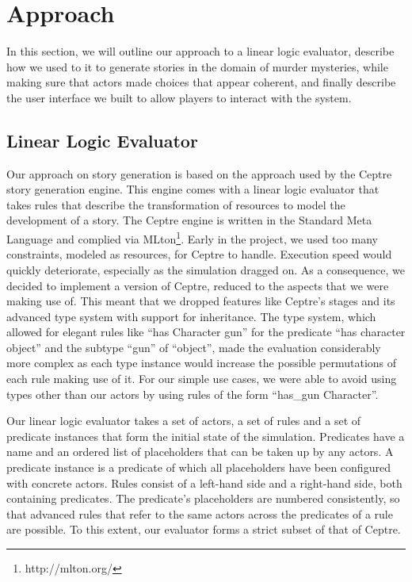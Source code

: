 \section{Approach} \label{approach}

In this section, we will outline our approach to a linear logic evaluator, describe how we used to it to generate stories in the domain of murder mysteries, while making sure that actors made choices that appear coherent, and finally describe the user interface we built to allow players to interact with the system.


\subsection{Linear Logic Evaluator}\label{own_linear_logic_evaluator}

Our approach on story generation is based on the approach used by the Ceptre story generation engine.
This engine comes with a linear logic evaluator that takes rules that describe the transformation of resources to model the development of a story.
The Ceptre engine is written in the Standard Meta Language and complied via MLton\footnote{http://mlton.org/}.
Early in the project, we used too many constraints, modeled as resources, for Ceptre to handle.
Execution speed would quickly deteriorate, especially as the simulation dragged on.
As a consequence, we decided to implement a version of Ceptre, reduced to the aspects that we were making use of.
This meant that we dropped features like Ceptre's stages and its advanced type system with support for inheritance.
The type system, which allowed for elegant rules like \enquote{has Character gun} for the predicate \enquote{has character object} and the subtype \enquote{gun} of \enquote{object}, made the evaluation considerably more complex as each type instance would increase the possible permutations of each rule making use of it.
For our simple use cases, we were able to avoid using types other than our actors by using rules of the form \enquote{has\_gun Character}.

Our linear logic evaluator takes a set of actors, a set of rules and a set of predicate instances that form the initial state of the simulation.
Predicates have a name and an ordered list of placeholders that can be taken up by any actors.
A predicate instance is a predicate of which all placeholders have been configured with concrete actors.
Rules consist of a left-hand side and a right-hand side, both containing predicates.
The predicate's placeholders are numbered consistently, so that advanced rules that refer to the same actors across the predicates of a rule are possible.
To this extent, our evaluator forms a strict subset of that of Ceptre. 


